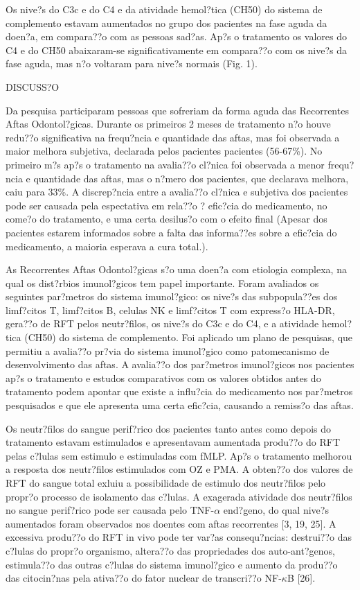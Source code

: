 \documentclass[12pt]{article}
\begin{document}
 Os nive?s do C3c e do C4 e da atividade hemol?tica (CH50) do sistema de
complemento estavam aumentados no grupo dos pacientes na fase aguda da doen?a,
em compara??o com as pessoas sad?as. Ap?s o tratamento os valores do C4 e do
CH50 abaixaram-se significativamente em compara??o com os nive?s da fase aguda,
mas n?o voltaram para nive?s normais (Fig. 1).

\begin{center}
\large{DISCUSS?O}
\end{center}

 Da pesquisa participaram pessoas que sofreriam da forma aguda das Recorrentes
Aftas Odontol?gicas. Durante os primeiros 2 meses de tratamento n?o houve
redu??o significativa na frequ?ncia e quantidade das aftas, mas foi observada a
maior melhora subjetiva, declarada pelos pacientes pacientes (56-67\%).  No
primeiro m?s ap?s o tratamento na avalia??o cl?nica foi observada a menor
frequ?ncia e quantidade das aftas, mas o n?mero dos pacientes, que declarava
melhora, caiu para 33\%. A discrep?ncia entre a avalia??o cl?nica e subjetiva
dos pacientes pode ser causada pela espectativa em rela??o ? efic?cia do
medicamento, no come?o do tratamento, e uma certa desilus?o com o efeito final
(Apesar dos pacientes estarem informados sobre a falta das informa??es sobre a
efic?cia do medicamento, a maioria esperava a cura total.).

 As Recorrentes Aftas Odontol?gicas s?o uma doen?a com etiologia complexa, na
qual os dist?rbios imunol?gicos tem papel importante. Foram avaliados os
seguintes par?metros do sistema imunol?gico: os nive?s das subpopula??es dos
limf?citos T, limf?citos B, celulas NK e limf?citos T com express?o HLA-DR,
gera??o de RFT pelos neutr?filos, os nive?s do C3c e do C4, e a atividade
hemol?tica (CH50) do sistema de complemento. Foi aplicado um plano de
pesquisas, que permitiu a avalia??o pr?via do sistema imunol?gico como
patomecanismo de desenvolvimento das aftas. A avalia??o dos par?metros
imunol?gicos nos pacientes ap?s o tratamento e estudos comparativos com os
valores obtidos antes do tratamento podem apontar que existe a influ?cia do
medicamento nos par?metros pesquisados e que ele apresenta uma certa efic?cia,
causando a remiss?o das aftas.

 Os neutr?filos do sangue perif?rico dos pacientes tanto antes como depois do
tratamento estavam estimulados e apresentavam aumentada produ??o do RFT pelas
c?lulas sem estimulo e estimuladas com fMLP. Ap?s o tratamento melhorou a
resposta dos neutr?filos estimulados com OZ e PMA. A obten??o dos valores de
RFT do sangue total exluiu a possibilidade de estimulo dos neutr?filos pelo
propr?o processo de isolamento das c?lulas.  A exagerada atividade dos
neutr?filos no sangue perif?rico pode ser causada pelo TNF-$\alpha$ end?geno,
do qual nive?s aumentados foram observados nos doentes com aftas recorrentes
[3, 19, 25]. A excessiva produ??o do RFT in vivo pode ter var?as consequ?ncias:
destrui??o das c?lulas do propr?o organismo, altera??o das propriedades dos
auto-ant?genos, estimula??o das outras c?lulas do sistema imunol?gico e aumento
da produ??o das citocin?nas pela ativa??o do fator nuclear de transcri??o
NF-$\kappa$B [26].
\end{document}

